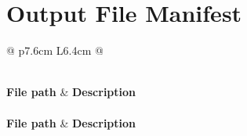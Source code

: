 \documentclass[12pt, a4paper, oneside]{report}
\newcommand{\ts}{\renewcommand{\arraystretch}{1.35}}
\begin{document}
\chapter{Output File Manifest}
\label{app:manifest}

\footnotesize
\ts
\setlength{\tabcolsep}{4pt}
\begin{longtable}{@{} p{7.6cm} L{6.4cm} @{}}
  \caption{Expected files under \texttt{outputs/} after a full pipeline run.}
  \label{tab:manifest} \\
  \toprule
  \textbf{File path} & \textbf{Description} \\
  \midrule
  \endfirsthead
   \\
  \toprule
  \textbf{File path} & \textbf{Description} \\
  \midrule
  \endhead
  \bottomrule
  \endfoot
  \bottomrule
  \endlastfoot


\end{longtable}
\end{document}
